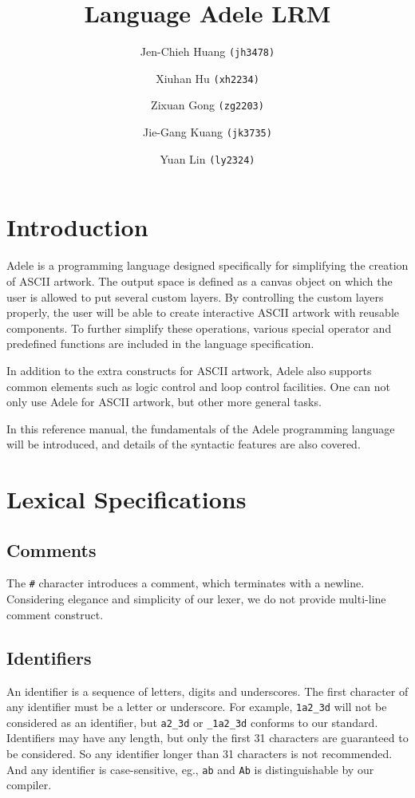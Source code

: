 \documentclass[11pt,letterpaper]{article}
\begin{document}
\title {Language Adele LRM}
\author {
	Jen-Chieh Huang \texttt{(jh3478)} \and Xiuhan Hu \texttt{(xh2234)} \and     
	Zixuan Gong \texttt{(zg2203)} \and Jie-Gang Kuang \texttt{(jk3735)} \and 
	Yuan Lin \texttt{(ly2324)}
}
\maketitle
\pagebreak
\begin{changemargin}{-0.5cm}{-0.5cm} 
\setcounter{tocdepth}{3}
\tableofcontents
\end{changemargin}
\pagebreak
\section {Introduction}
Adele is a programming language designed specifically for simplifying the creation of ASCII artwork. The output space is defined as a canvas object on which the user is allowed to put several custom layers. By controlling the custom layers properly, the user will be able to create interactive ASCII artwork with reusable components. To further simplify these operations, various special operator and predefined functions are included in the language specification.

In addition to the extra constructs for ASCII artwork, Adele also supports common elements such as logic control and loop control facilities. One can not only use Adele for ASCII artwork, but other more general tasks.

In this reference manual, the fundamentals of the Adele programming language will be introduced, and details of the syntactic features are also covered.

\section {Lexical Specifications}
\subsection {Comments}
The \texttt{\#} character introduces a comment, which terminates with a newline. Considering elegance and simplicity of our lexer, we do not provide multi-line comment construct. 

\subsection {Identifiers}
An identifier is a sequence of letters, digits and underscores. The first character of any identifier must be a letter or underscore. For example, \texttt {1a2\_3d} will not be considered as an identifier, but \texttt{a2\_3d} or \texttt{\_1a2\_3d} conforms to our standard. Identifiers may have any length, but only the first 31 characters are guaranteed to be considered. So any identifier longer than 31 characters is not recommended. And any identifier is case-sensitive, eg., \texttt{ab} and \texttt{Ab} is distinguishable by our compiler.
\end{document}
